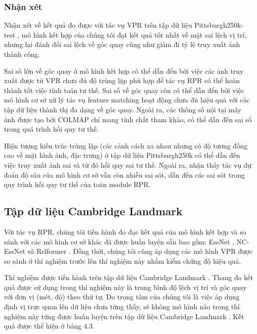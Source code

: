 \subsubsection*{Nhận xét}
Nhận xét về kết quả đo được với tác vụ VPR trên tập dữ liệu Pittsburgh250k-test \cite{6618963}, mô hình kết hợp của chúng tôi đạt kết quả tốt nhất về mặt sai lệch vị trí, nhưng lại đánh đổi sai lệch về góc quay cũng như giảm đi tỷ lệ truy xuất ảnh thành công. 

Sai số lớn về góc quay ở mô hình kết hợp có thể dẫn đến bởi việc các ảnh truy xuất được từ VPR chưa đủ độ trùng lặp phù hợp để tác vụ RPR có thể hoàn thành tốt việc tính toán tư thế. Sai số về góc quay còn có thể dẫn đến bởi việc mô hình cơ sở xử lý tác vụ feature matching hoạt động chưa đủ hiệu quả với các tập dữ liệu thành thị đa dạng về góc quay. Ngoài ra, các thông số nội tại máy ảnh được tạo bởi COLMAP chỉ mang tính chất tham khảo, có thể dẫn đến sai số trong quá trình hồi quy tư thế.

Hiện tượng kiến trúc trùng lặp (các cảnh cách xa nhau nhưng có độ tương đồng cao về mặt hình ảnh, đặc trưng) ở tập dữ liệu Pittsburgh250k \cite{6618963} có thể dẫn đến việc truy xuất ảnh sai và từ đó hồi quy sai tư thế. Ngoài ra, nhận thấy tác vụ dự đoán độ sâu của mô hình cơ sở vẫn còn nhiều sai sót, dẫn đến các sai sót trong quy trình hồi quy tư thế của toàn module RPR.

\subsection*{Tập dữ liệu Cambridge Landmark}

Với tác vụ RPR, chúng tôi tiến hành đo đạc kết quả của mô hình kết hợp và so sánh với các mô hình cơ sở khác đã được huấn luyện sẵn bao gồm: EssNet \cite{zhou2020learn}, NC-EssNet \cite{zhou2020learn} và Relformer \cite{idan2023learning}. Đồng thời, chúng tôi cũng áp dụng các mô hình VPR được so sánh ở thí nghiệm trước lên thí nghiệm này nhằm kiểm chứng độ hiệu quả. 

Thí nghiệm được tiến hành trên tập dữ liệu Cambridge Landmark \cite{kendall2016posenet}. Thang đo kết quả được sử dụng trong thí nghiệm này là trung bình độ lệch vị trí và góc quay với đơn vị (mét, độ) theo thứ tự. Do trọng tâm của chúng tôi là việc áp dụng định vị trực quan lên dữ liệu chưa từng thấy, sẽ không mô hình nào trong thí nghiệm này từng được huấn luyện trên tập dữ liệu Cambridge Landmark \cite{kendall2016posenet}. Kết quả được thể hiện ở bảng 4.3.

